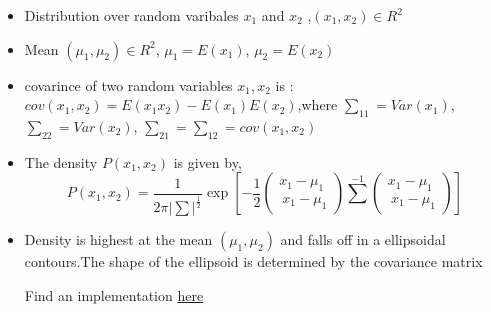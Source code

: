 \documentclass[12pt]{article}
\begin{document}
\begin{itemize}
\item	Distribution over random varibales $x_{1}$ and $x_{2}$ ,$(x_{1} ,  x_{2})\in R^{2}$
	
\item	Mean $(\mu_{1},\mu _{2}) \in R^{2}$,  $ \mu_{1}=E(x_{1})$,  $\mu_{2}=E(x_{2})$
	
\item	covarince of two random variables $x_{1},x_{2}$ is : $cov(x_{1},x_{2})=E(x_{1}x_{2})-E(x_{1})E(x_{2})$,where $\sum_{11}=Var(x_{1})$, $\sum_{22}=Var(x_{2})$, $\sum_{21}=\sum_{12}=cov(x_{1},x_{2})$
	
\item	The density $P(x_{1},x_{2})$ is given by, $$P(x_{1},x_{2})=\frac{1}{2\pi \vert \sum \vert ^{\frac{1}{2}}} \exp[-\frac{1}{2} \left({\begin{array}{cc}{x_{1}-\mu_{1}}\\\ {x_{1}-\mu_{1}}\end{array}}\right) \sum^{-1} \left({\begin{array}{cc}{x_{1}-\mu_{1}}\\\ {x_{1}-\mu_{1}}\end{array}}\right)]$$
	
\item Density is highest at the mean $(\mu_{1},\mu_{2})$ and falls off in a ellipsoidal contours.The shape of the ellipsoid is determined by the covariance matrix
	

Find an implementation \href{https://github.com/aswin16/ML-REPORT/blob/master/codes/winery-multivariate/winery-classification-gaussian.ipynb}{here}
	
	
\end{itemize}



















 
\end{document}
